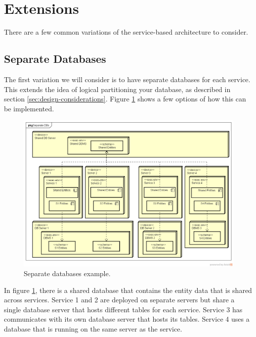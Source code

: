 \section{Extensions}

There are a few common variations of the service-based architecture to consider.

\subsection{Separate Databases}

The first variation  we will consider is to have separate databases for each service.
This extends the idea of logical partitioning your database, as described in section \ref{sec:design-considerations}.
Figure \ref{fig:separate-dbs} shows a few options of how this can be implemented.

\begin{figure}[h!]
    \begin{adjustwidth}{-5mm}{-5mm}
        \centering
        \includegraphics[trim=39 42 18 48,clip,width=0.92\paperwidth]{diagrams/separate-dbs.png}
    \end{adjustwidth}
    \caption{Separate databases example.}
    \label{fig:separate-dbs}
\end{figure}

In figure \ref{fig:separate-dbs}, there is a shared database that contains the entity data that is shared across services.
Service 1 and 2 are deployed on separate servers but share a single database server that hosts different tables for each service.
Service 3 has communicates with its own database server that hosts its tables.
Service 4 uses a database that is running on the same server as the service.

